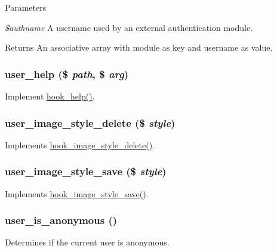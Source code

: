 \begin{DoxyParams}{Parameters}
\item[{\em \$authname}]A username used by an external authentication module. \end{DoxyParams}
\begin{DoxyReturn}{Returns}
An associative array with module as key and username as value. 
\end{DoxyReturn}
\hypertarget{user_8module_a7c042ca4fed4db807b9073d19269f760}{
\subsubsection[{user\_\-help}]{\setlength{\rightskip}{0pt plus 5cm}user\_\-help (\$ {\em path}, \/  \$ {\em arg})}}
\label{user_8module_a7c042ca4fed4db807b9073d19269f760}
Implement \hyperlink{group__hooks_ga5589c2714a782738e8851c4c90231f0e}{hook\_\-help()}. \hypertarget{user_8module_a8a773378fc4c0afa38865bbee2e88419}{
\subsubsection[{user\_\-image\_\-style\_\-delete}]{\setlength{\rightskip}{0pt plus 5cm}user\_\-image\_\-style\_\-delete (\$ {\em style})}}
\label{user_8module_a8a773378fc4c0afa38865bbee2e88419}
Implements \hyperlink{group__hooks_ga376a3d4a9427d6a8dad73d68bdd140dc}{hook\_\-image\_\-style\_\-delete()}. \hypertarget{user_8module_ab3fec9538f68340d18a8c9b204e38f49}{
\subsubsection[{user\_\-image\_\-style\_\-save}]{\setlength{\rightskip}{0pt plus 5cm}user\_\-image\_\-style\_\-save (\$ {\em style})}}
\label{user_8module_ab3fec9538f68340d18a8c9b204e38f49}
Implements \hyperlink{group__hooks_gad403dde0a7859e160772ae696ab35cea}{hook\_\-image\_\-style\_\-save()}. \hypertarget{user_8module_af00464c62c20062112b8a25500719f69}{
\subsubsection[{user\_\-is\_\-anonymous}]{\setlength{\rightskip}{0pt plus 5cm}user\_\-is\_\-anonymous ()}}
\label{user_8module_af00464c62c20062112b8a25500719f69}
Determines if the current user is anonymous.

